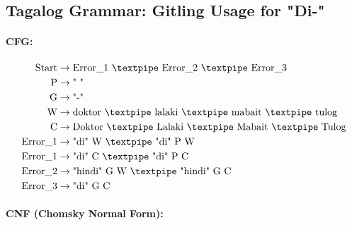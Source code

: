 \subsection{Tagalog Grammar: Gitling Usage for "Di-"}

\paragraph{CFG:}

\begin{equation*}
    \begin{aligned}
        \text{Start}  & \rightarrow \text{Error\_1 {\textpipe} Error\_2 {\textpipe} Error\_3}   \\
        \text{P}   & \rightarrow \text{" "}\\
        \text{G} & \rightarrow \text{"-"}\\        
        \text{W} & \rightarrow \text{doktor {\textpipe} lalaki {\textpipe} mabait {\textpipe} tulog}   \\
        \text{C} & \rightarrow \text{Doktor {\textpipe} Lalaki {\textpipe} Mabait {\textpipe} Tulog}   \\
        \text{Error\_1}  & \rightarrow \text{"di" W {\textpipe} "di" P W}   \\
        \text{Error\_1}  & \rightarrow \text{"di" C {\textpipe} "di" P C}   \\
        \text{Error\_2}  & \rightarrow \text{"hindi" G W {\textpipe} "hindi" G C}   \\
        \text{Error\_3}  & \rightarrow \text{"di" G C}   
    \end{aligned}
\end{equation*}

\paragraph{CNF (Chomsky Normal Form):}

